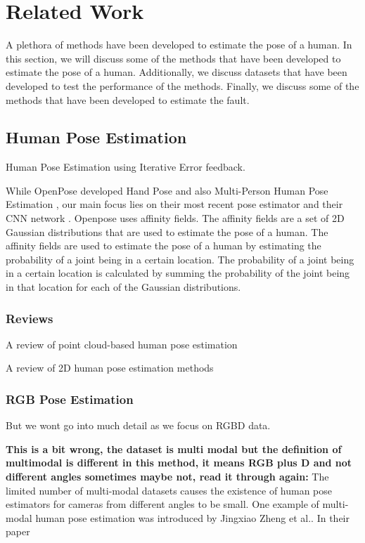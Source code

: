 \section{Related Work}
\label{sec:related_work}

A plethora of methods have been developed to estimate the pose of a human. In this section, we will discuss some of the methods that have been developed to estimate the pose of a human. Additionally, we discuss datasets that have been developed to test the performance of the methods. Finally, we discuss some of the methods that have been developed to estimate the fault.

\subsection{Human Pose Estimation}


Human Pose Estimation using Iterative Error feedback. \cite{IterativeErrorFeedback}

While OpenPose developed Hand Pose\cite{OpenPoseHand} and also Multi-Person Human Pose Estimation \cite{OpenPoseMulti}, our main focus lies on their most recent pose estimator \cite{OpenPosePose} and their CNN network \cite{OpenPoseCNN}. Openpose uses affinity fields. The affinity fields are a set of 2D Gaussian distributions that are used to estimate the pose of a human. The affinity fields are used to estimate the pose of a human by estimating the probability of a joint being in a certain location. The probability of a joint being in a certain location is calculated by summing the probability of the joint being in that location for each of the Gaussian distributions.

\subsubsection{Reviews}


A review of point cloud-based human pose estimation \cite{ReviewPointcloudHPE}

A review of 2D human pose estimation methods \cite{ReviewHPE}

\subsubsection{RGB Pose Estimation}

\cite{RGBHPE}

But we wont go into much detail as we focus on RGBD data.

\textbf{This is a bit wrong, the dataset is multi modal but the definition of multimodal is different in this method, it means RGB plus D and not different angles sometimes maybe not, read it through again:}
The limited number of multi-modal datasets causes the existence of human pose estimators for cameras from different angles to be small. One example of multi-modal human pose estimation was introduced by Jingxiao Zheng et al.\cite{MultiModalHPERGBD}. In their paper 

